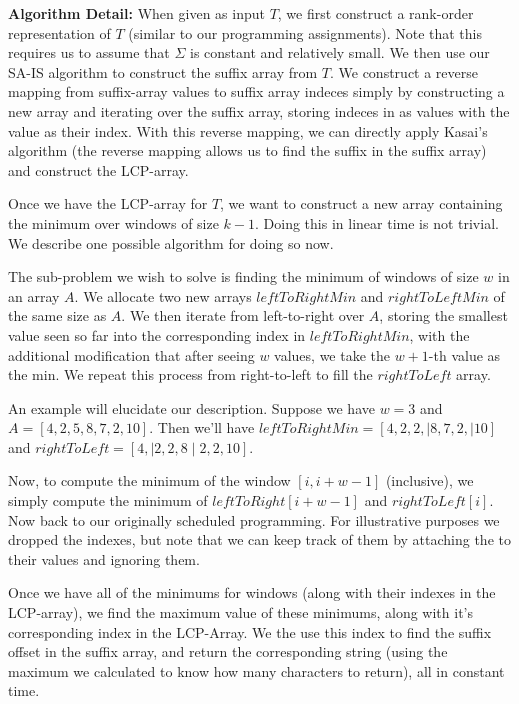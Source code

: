 \documentclass[12pt]{exam}
\begin{document}
\begin{questions}
\begin{solution}
\textbf{Algorithm Detail:}
When given as input $T$, we first construct a rank-order representation of $T$ (similar to our programming assignments). Note that this requires us to assume that $\Sigma$ is constant and relatively small. We then use our SA-IS algorithm to construct the suffix array from $T$. We construct a reverse mapping from suffix-array values to suffix array indeces simply by constructing a new array and iterating over the suffix array, storing indeces in as values with the value as their index. With this reverse mapping, we can directly apply Kasai's algorithm (the reverse mapping allows us to find the suffix in the suffix array) and construct the LCP-array. 

Once we have the LCP-array for $T$, we want to construct a new array containing the minimum over windows of size $k-1$. Doing this in linear time is not trivial. We describe one possible algorithm for doing so now.

The sub-problem we wish to solve is finding the minimum of windows of size $w$ in an array $A$. We allocate two new arrays $leftToRightMin$ and $rightToLeftMin$ of the same size as $A$. We then iterate from left-to-right over $A$, storing the smallest value seen so far into the corresponding index in $leftToRightMin$, with the additional modification that after seeing $w$ values, we take the $w+1$-th value as the min. We repeat this process from right-to-left to fill the $rightToLeft$ array. 

An example will elucidate our description. Suppose we have $w = 3$ and $A = [4, 2, 5, 8, 7, 2, 10]$. Then we'll have $leftToRightMin = [4, 2, 2, \mid 8, 7, 2, \mid 10]$ and $rightToLeft = [4, \mid 2, 2, 8 \mid 2, 2, 10]$. 

Now, to compute the minimum of the window $[i, i + w - 1]$ (inclusive), we simply compute the minimum of $leftToRight[i + w -1]$ and $rightToLeft[i]$. Now back to our originally scheduled programming. For illustrative purposes we dropped the indexes, but note that we can keep track of them by attaching the to their values and ignoring them.

Once we have all of the minimums for windows (along with their indexes in the LCP-array), we find the maximum value of these minimums, along with it's corresponding index in the LCP-Array. We the use this index to find the suffix offset in the suffix array, and return the corresponding string (using the maximum we calculated to know how many characters to return), all in constant time.


\end{solution}
\end{questions}
\end{document}

